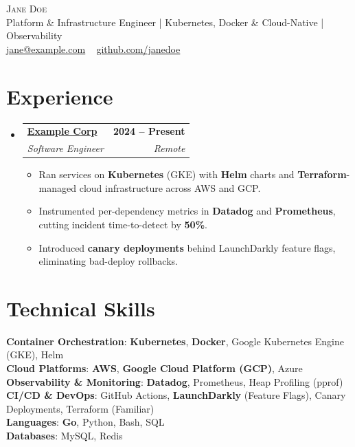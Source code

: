 \documentclass[letterpaper,11pt]{article}
\makeatletter
\newcommand{\resumeItem}[1]{
  \item\small{
    {#1 \vspace{-2pt}}
  }
}
\newcommand{\resumeSubheading}[4]{
  \vspace{-2pt}\item
    \begin{tabular*}{1.0\textwidth}[t]{l@{\extracolsep{\fill}}r}
      \textbf{#1} & \textbf{\small #2} \\
      \textit{\small#3} & \textit{\small #4} \\
    \end{tabular*}\vspace{-7pt}
}
\newcommand{\resumeSubHeadingListStart}{\begin{itemize}[leftmargin=0.0in, label={}]}
\newcommand{\resumeSubHeadingListEnd}{\end{itemize}}
\newcommand{\resumeItemListStart}{\begin{itemize}}
\newcommand{\resumeItemListEnd}{\end{itemize}\vspace{-5pt}}
\makeatother
\begin{document}
\begin{center}
    {\Huge \scshape Jane Doe} \\ \vspace{1pt}
    \small Platform \& Infrastructure Engineer | Kubernetes, Docker \& Cloud-Native | Observability \\ \vspace{1pt}
    \small \href{mailto:jane@example.com}{\underline{jane@example.com}} ~
    \href{https://github.com/janedoe}{\underline{github.com/janedoe}}
    \vspace{-8pt}
\end{center}

\section{Experience}
\resumeSubHeadingListStart

    \resumeSubheading
    {\href{https://example.com/}{Example Corp}}{2024 -- Present}
    {Software Engineer}{Remote}
    \resumeItemListStart
        \resumeItem{Ran services on \textbf{Kubernetes} (GKE) with \textbf{Helm} charts and \textbf{Terraform}-managed cloud infrastructure across AWS and GCP.}
        \resumeItem{Instrumented per-dependency metrics in \textbf{Datadog} and \textbf{Prometheus}, cutting incident time-to-detect by \textbf{50\%}.}
        \resumeItem{Introduced \textbf{canary deployments} behind LaunchDarkly feature flags, eliminating bad-deploy rollbacks.}
    \resumeItemListEnd

\resumeSubHeadingListEnd
\vspace{-16pt}

\section{Technical Skills}
 \begin{itemize}[leftmargin=0.15in, label={}]
    \small{\item{
     \textbf{Container Orchestration}{: \textbf{Kubernetes}, \textbf{Docker}, Google Kubernetes Engine (GKE), Helm} \\
     \textbf{Cloud Platforms}{: \textbf{AWS}, \textbf{Google Cloud Platform (GCP)}, Azure} \\
     \textbf{Observability \& Monitoring}{: \textbf{Datadog}, Prometheus, Heap Profiling (pprof)} \\
     \textbf{CI/CD \& DevOps}{: GitHub Actions, \textbf{LaunchDarkly} (Feature Flags), Canary Deployments, Terraform (Familiar)} \\
     \textbf{Languages}{: \textbf{Go}, Python, Bash, SQL} \\
     \textbf{Databases}{: MySQL, Redis} \\
    }}
 \end{itemize}
 \vspace{-16pt}
\end{document}
